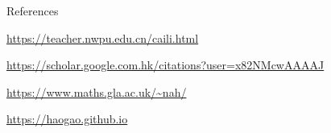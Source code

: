 
\begin{rubric}{References}

\entry*[Supervisors] 
\url{https://teacher.nwpu.edu.cn/caili.html}\par

\entry*[Publication]%
\url{https://scholar.google.com.hk/citations?user=x82NMcwAAAAJ}



\entry*[Collaborators]%
\url{https://www.maths.gla.ac.uk/~nah/}\par
\url{https://haogao.github.io}\par




\end{rubric}